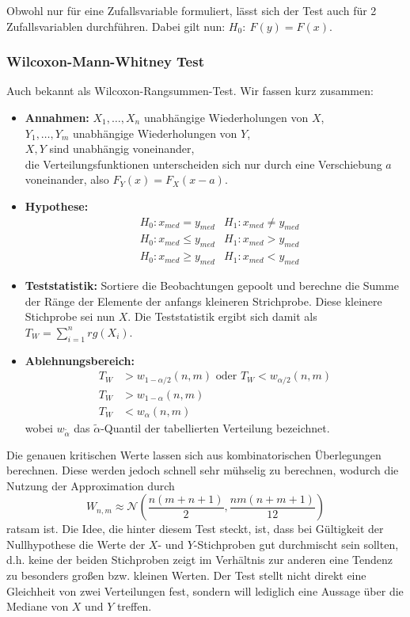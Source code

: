Obwohl nur für eine Zufallsvariable formuliert, lässt sich der Test auch für 2 
Zufallsvariablen durchführen. Dabei gilt nun: \(H_0:\ F(y) = F(x)\).

\subsubsection{Wilcoxon-Mann-Whitney Test}
Auch bekannt als Wilcoxon-Rangsummen-Test. Wir fassen kurz zusammen:
\begin{itemize}
	\item \textbf{Annahmen:} \(X_1,\dots,X_n\) unabhängige Wiederholungen von \(X\),\\
				\(Y_1,\dots,Y_m\) unabhängige Wiederholungen von \(Y\),\\
				\(X,Y\) sind unabhängig voneinander,\\
				die Verteilungsfunktionen unterscheiden sich nur durch eine Verschiebung \(a\) voneinander, also \(F_Y(x) = F_X(x-a)\). 
	\item \textbf{Hypothese:} \begin{align}
					&H_0: x_{med}=y_{med} 	&H_1: x_{med}\neq y_{med} \tag{a}\\
					&H_0: x_{med}\leq y_{med} &H_1: x_{med} > y_{med} \tag{b}\\
					&H_0: x_{med}\geq y_{med} &H_1: x_{med} < y_{med} \tag{c}
				\end{align}
	\item \textbf{Teststatistik:} Sortiere die Beobachtungen gepoolt und berechne die Summe der Ränge der
	Elemente der anfangs kleineren Strichprobe. Diese kleinere Stichprobe sei nun \(X\). Die Teststatistik ergibt sich damit als
	\(T_W = \sum\limits_{i=1}^n rg(X_i)\).
	\item \textbf{Ablehnungsbereich:} \begin{align}
						T_W &> w_{1-\alpha /2}(n,m) \text{ oder } T_W < w_{\alpha /2}(n,m) \tag{a}\\
						T_W &> w_{1-\alpha}(n,m) \tag{b}\\
						T_W &< w_{\alpha}(n,m) \tag{c}
					\end{align}
					wobei \(w_{\tilde{\alpha}}\) das \(\tilde{\alpha}\)-Quantil der tabellierten Verteilung bezeichnet.
\end{itemize}
Die genauen kritischen Werte lassen sich aus kombinatorischen Überlegungen 
berechnen. Diese werden jedoch schnell sehr mühselig zu berechnen, wodurch 
die Nutzung der Approximation durch
\[
	W_{n,m} \approx \mathcal{N} \left( \frac{n(m+n+1)}{2}, \frac{nm(n+m+1)}{12} \right)
\]
ratsam ist. Die Idee, die hinter diesem Test steckt, ist, dass bei Gültigkeit
der Nullhypothese die Werte der \(X\)- und \(Y\)-Stichproben gut durchmischt
sein sollten, d.h. keine der beiden Stichproben zeigt im Verhältnis zur anderen
eine Tendenz zu besonders großen bzw. kleinen Werten. Der Test stellt nicht direkt
eine Gleichheit von zwei Verteilungen fest, sondern will lediglich eine Aussage über
die Mediane von \(X\) und \(Y\) treffen.


